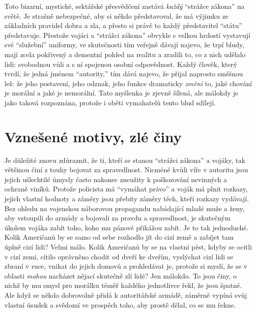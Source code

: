 \documentclass{book}
\begin{document}
Toto bizarní, mystické, sektářské přesvědčení zastává \emph{každý} \enquote{strážce zákona} na světě. Je strašně nebezpečné, aby si někdo představoval, že má výjimku ze základních pravidel dobra a zla, a přesto si právě to každý představitel \enquote{státu} představuje. Přestože vojáci a \enquote{strážci zákona} obvykle s velkou hrdostí vystavují své \enquote{služební} uniformy, ve skutečnosti tím veřejně dávají najevo, že trpí bludy, mají zcela pokřivený a dementní pohled na realitu a zradili to, co z nich udělalo lidi: svobodnou vůli a s ní spojenou osobní odpovědnost. Každý člověk, který tvrdí, že jedná jménem \enquote{autority,} tím dává najevo, že přijal naprosto směšnou lež: že jeho postavení, jeho odznak, jeho funkce dramaticky \emph{změní} to, jaké chování je morální a jaké je nemorální. Tato myšlenka je zjevně šílená, ale málokdy je jako taková rozpoznána, protože i oběti vymahatelů tento blud sdílejí.

\section{Vznešené motivy, zlé činy}

Je důležité znovu zdůraznit, že ti, kteří se stanou \enquote{strážci zákona} a vojáky, tak většinou činí z touhy bojovat za spravedlnost. Nicméně kvůli víře v autoritu jsou jejich ušlechtilé úmysly často nakonec zneužity k poškozování nevinných a ochraně viníků. Protože policista má \enquote{vymáhat právo} a voják má plnit rozkazy, jejich vlastní hodnoty a záměry jsou přebity záměry těch, kteří rozkazy vydávají. Bez ohledu na vojenskou náborovou propagandu nabádající mladé muže a ženy, aby vstoupili do armády a bojovali za pravdu a spravedlnost, je skutečným úkolem vojáka zabít toho, koho mu pánové přikážou zabít. Je to tak jednoduché. Kolik Američanů by se samo od sebe rozhodlo jít do cizí země a zabíjet tam úplně cizí lidi? Velmi málo. Kolik Američanů by se na vlastní pěst, kdyby se ocitli v cizí zemi, cítilo oprávněno chodit od dveří ke dveřím, vyslýchat cizí lidi se zbraní v ruce, vnikat do jejich domovů a prohledávat je, protože si myslí, že se v oblasti \emph{mohou} nacházet nějací skutečně zlí lidé? Jen málokdo. To jsou činy, o nichž by mu smysl pro morálku téměř každého jednotlivce řekl, že jsou špatné. Ale když se někdo dobrovolně přidá k autoritářské armádě, záměrně vypíná svůj vlastní úsudek a svědomí ve prospěch toho, aby prostě dělal, co se mu řekne.
\end{document}
